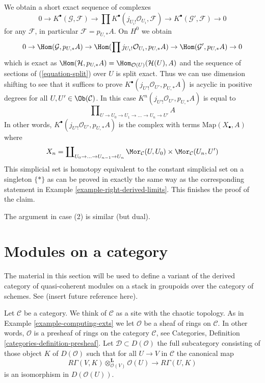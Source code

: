 \begin{example}
We obtain a short exact sequence of complexes
$$
0 \to
K^\bullet(\mathcal{G}, \mathcal{F}) \to
\prod K^\bullet(j_{U_i!}\mathcal{O}_{U_i}, \mathcal{F}) \to
K^\bullet(\mathcal{G}', \mathcal{F}) \to 0
$$
for any $\mathcal{F}$, in particular $\mathcal{F} = p_{U, *}A$.
On $H^0$ we obtain
$$
0 \to \Hom(\mathcal{G}, p_{U, *}A) \to
\Hom(\prod j_{U_i!}\mathcal{O}_{U_i}, p_{U, *}A) \to
\Hom(\mathcal{G}', p_{U, *}A) \to 0
$$
which is exact as
$\Hom(\mathcal{H}, p_{U, *}A) = \Hom_{\mathcal{O}(U)}(\mathcal{H}(U), A)$
and the sequence of sections of (\ref{equation-split}) over $U$ is split exact.
Thus we can use dimension shifting to see that it suffices to prove
$K^\bullet(j_{U'!}\mathcal{O}_{U'}, p_{U, *}A)$ is acyclic in positive
degrees for all $U, U' \in \Ob(\mathcal{C})$. In this case
$K^n(j_{U'!}\mathcal{O}_{U'}, p_{U, *}A)$ is equal to
$$
\prod\nolimits_{U \to U_0 \to U_1 \to \ldots \to U_n \to U'} A
$$
In other words, $K^\bullet(j_{U'!}\mathcal{O}_{U'}, p_{U, *}A)$
is the complex with terms $\text{Map}(X_\bullet, A)$ where
$$
X_n = \coprod\nolimits_{U_0 \to \ldots \to U_{n - 1} \to U_n}
\Mor_\mathcal{C}(U, U_0) \times \Mor_\mathcal{C}(U_n, U')
$$
This simplicial set is homotopy equivalent to the constant simplicial
set on a singleton $\{*\}$ as can be proved in exactly the same way
as the corresponding statement in Example \ref{example-right-derived-limits}.
This finishes the proof of the claim.

\medskip\noindent
The argument in case (2) is similar (but dual).
\end{example}






\section{Modules on a category}
\label{section-modules-cohomology}

\noindent
The material in this section will be used to define a variant of the
derived category of quasi-coherent modules on a stack in groupoids
over the category of schemes. See (insert future reference here).

\medskip\noindent
Let $\mathcal{C}$ be a category. We think of $\mathcal{C}$ as a site with
the chaotic topology. As in Example \ref{example-computing-exts} we let
$\mathcal{O}$ be a sheaf of rings on $\mathcal{C}$.
In other words, $\mathcal{O}$ is
a presheaf of rings on the category $\mathcal{C}$, see
Categories, Definition \ref{categories-definition-presheaf}.
Let $\mathcal{D} \subset D(\mathcal{O})$ the full subcategory
consisting of those object $K$ of $D(\mathcal{O})$ such that
for all $U \to V$ in $\mathcal{C}$ the canonical map
$$
R\Gamma(V, K) \otimes_{\mathcal{O}(V)}^\mathbf{L} \mathcal{O}(U)
\longrightarrow
R\Gamma(U, K)
$$
is an isomorphism in $D(\mathcal{O}(U))$.

